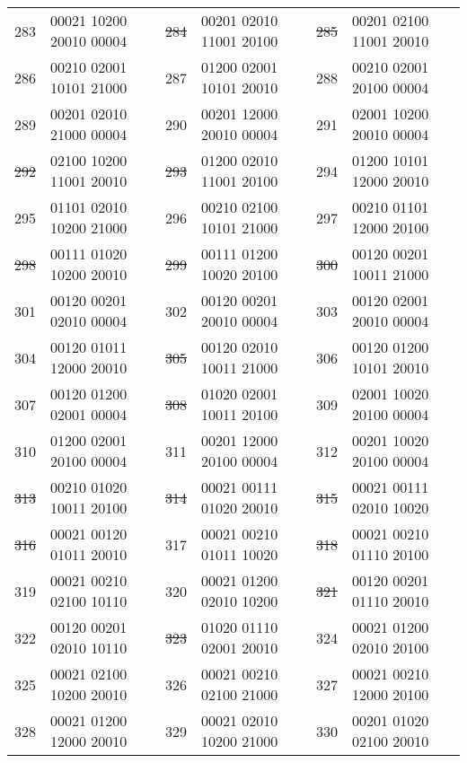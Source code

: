 \begin{tabular}{|l|l||l|l||l|l|}
{283} &00021 10200 20010 00004 &
\sout{284} &00201 02010 11001 20100 &
\sout{285} &00201 02100 11001 20010 \\
{286} &00210 02001 10101 21000 &
{287} &01200 02001 10101 20010 &
{288} &00210 02001 20100 00004 \\
{289} &00201 02010 21000 00004 &
{290} &00201 12000 20010 00004 &
{291} &02001 10200 20010 00004 \\
\sout{292} &02100 10200 11001 20010 &
\sout{293} &01200 02010 11001 20100 &
{294} &01200 10101 12000 20010 \\
{295} &01101 02010 10200 21000 &
{296} &00210 02100 10101 21000 &
{297} &00210 01101 12000 20100 \\
\sout{298} &00111 01020 10200 20010 &
\sout{299} &00111 01200 10020 20100 &
\sout{300} &00120 00201 10011 21000 \\
{301} &00120 00201 02010 00004 &
{302} &00120 00201 20010 00004 &
{303} &00120 02001 20010 00004 \\
{304} &00120 01011 12000 20010 &
\sout{305} &00120 02010 10011 21000 &
{306} &00120 01200 10101 20010 \\
{307} &00120 01200 02001 00004 &
\sout{308} &01020 02001 10011 20100 &
{309} &02001 10020 20100 00004 \\
{310} &01200 02001 20100 00004 &
{311} &00201 12000 20100 00004 &
{312} &00201 10020 20100 00004 \\
\sout{313} &00210 01020 10011 20100 &
\sout{314} &00021 00111 01020 20010 &
\sout{315} &00021 00111 02010 10020 \\
\sout{316} &00021 00120 01011 20010 &
{317} &00021 00210 01011 10020 &
\sout{318} &00021 00210 01110 20100 \\
{319} &00021 00210 02100 10110 &
{320} &00021 01200 02010 10200 &
\sout{321} &00120 00201 01110 20010 \\
{322} &00120 00201 02010 10110 &
\sout{323} &01020 01110 02001 20010 &
{324} &00021 01200 02010 20100 \\
{325} &00021 02100 10200 20010 &
{326} &00021 00210 02100 21000 &
{327} &00021 00210 12000 20100 \\
{328} &00021 01200 12000 20010 &
{329} &00021 02010 10200 21000 &
{330} &00201 01020 02100 20010 \\
\hline
\end{tabular}


